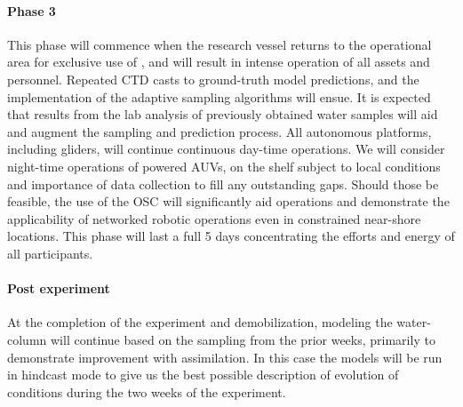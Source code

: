 \paragraph{Phase 3} This phase will commence when the research vessel
returns to the \naz operational area for exclusive use of \proje, and
will result in intense operation of all assets and personnel. Repeated
CTD casts to ground-truth model predictions, and the implementation of
the adaptive sampling algorithms will ensue. It is expected that results
from the lab analysis of previously obtained water samples will aid and
augment the sampling and prediction process. All autonomous platforms,
including gliders, will continue continuous day-time operations. We will
consider night-time operations of powered AUVs, on the shelf subject to
local conditions and importance of data collection to fill any
outstanding gaps. Should those be feasible, the use of the OSC will
significantly aid operations and demonstrate the applicability of
networked robotic operations even in constrained near-shore locations.
This phase will last a full 5 days concentrating the efforts and energy
of all participants.

\paragraph{Post experiment} At the completion of the experiment and
demobilization, modeling the water-column will continue based on the
sampling from the prior weeks, primarily to demonstrate improvement with
assimilation. In this case the models will be run in hindcast mode to
give us the best possible description of evolution of conditions during
the two weeks of the experiment.


